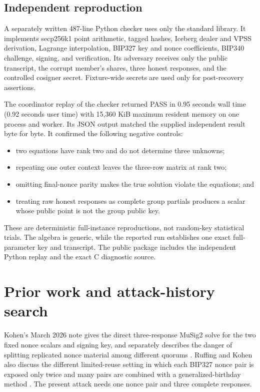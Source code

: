 \documentclass[10pt,a4paper]{article}
\begin{document}
\subsection{Independent reproduction}

A separately written 487-line Python checker uses only the standard library.
It implements secp256k1 point arithmetic, tagged hashes, Iceberg dealer and
VPSS derivation, Lagrange interpolation, BIP327 key and nonce coefficients,
BIP340 challenge, signing, and verification. Its adversary receives only the
public transcript, the corrupt member's shares, three honest responses, and
the controlled cosigner secret. Fixture-wide secrets are used only for
post-recovery assertions.

The coordinator replay of the checker returned PASS in 0.95 seconds wall time
(0.92 seconds user time) with 15,360 KiB maximum resident memory on one
process and worker. Its JSON output matched the supplied
independent result byte for byte. It confirmed the following negative
controls:
\begin{itemize}
  \item two equations have rank two and do not determine three unknowns;
  \item repeating one outer context leaves the three-row matrix at rank two;
  \item omitting final-nonce parity makes the true solution violate the
        equations; and
  \item treating raw honest responses as complete group partials produces a
        scalar whose public point is not the group public key.
\end{itemize}

These are deterministic full-instance reproductions, not random-key
statistical trials. The algebra is generic, while the reported run establishes
one exact full-parameter key and transcript. The public package includes the
independent Python replay and the exact C diagnostic source.

\section{Prior work and attack-history search}

Kohen's March 2026 note gives the direct three-response MuSig2 solve for the
two fixed nonce scalars and signing key, and separately describes the danger of
splitting replicated nonce material among different quorums
\cite{kohenreuse}. Ruffing and Kohen also discuss the different limited-reuse
setting in which each BIP327 nonce pair is exposed only twice and many pairs
are combined with a generalized-birthday method \cite{ruffing}. The present
attack needs one nonce pair and three complete responses.
\end{document}
